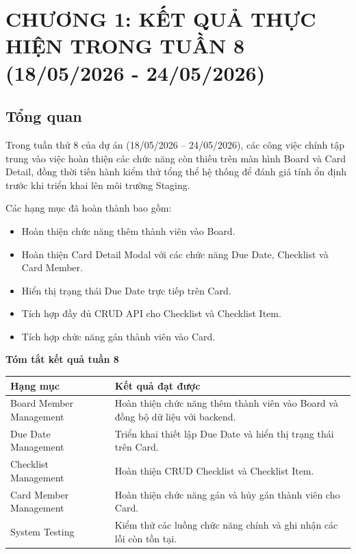 \section{CHƯƠNG 1: KẾT QUẢ THỰC HIỆN TRONG TUẦN 8 (18/05/2026 - 24/05/2026)}

\subsection{Tổng quan}

Trong tuần thứ 8 của dự án (18/05/2026 -- 24/05/2026), các công việc
chính tập trung vào việc hoàn thiện các chức năng còn thiếu trên màn hình
Board và Card Detail, đồng thời tiến hành kiểm thử tổng thể hệ thống để
đánh giá tính ổn định trước khi triển khai lên môi trường Staging.

Các hạng mục đã hoàn thành bao gồm:

\begin{itemize}
    \item Hoàn thiện chức năng thêm thành viên vào Board.
    \item Hoàn thiện Card Detail Modal với các chức năng Due Date,
    Checklist và Card Member.
    \item Hiển thị trạng thái Due Date trực tiếp trên Card.
    \item Tích hợp đầy đủ CRUD API cho Checklist và Checklist Item.
    \item Tích hợp chức năng gán thành viên vào Card.
\end{itemize}

\textbf{Tóm tắt kết quả tuần 8}

\begin{table}[H]
\centering
\begin{tabular}{|p{4cm}|p{9cm}|}
\hline
\textbf{Hạng mục} & \textbf{Kết quả đạt được} \\
\hline
Board Member Management &
Hoàn thiện chức năng thêm thành viên vào Board và đồng bộ dữ liệu với backend. \\
\hline
Due Date Management &
Triển khai thiết lập Due Date và hiển thị trạng thái trên Card. \\
\hline
Checklist Management &
Hoàn thiện CRUD Checklist và Checklist Item. \\
\hline
Card Member Management &
Hoàn thiện chức năng gán và hủy gán thành viên cho Card. \\
\hline
System Testing &
Kiểm thử các luồng chức năng chính và ghi nhận các lỗi còn tồn tại. \\
\hline
\end{tabular}
\end{table}
\clearpage

